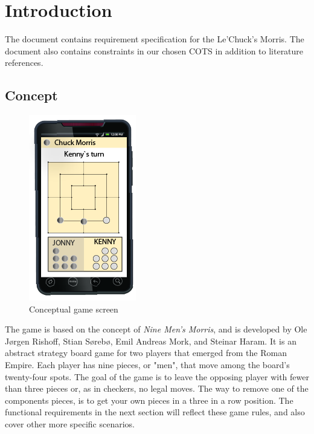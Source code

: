 \section{Introduction}

The document contains requirement specification for the Le'Chuck's Morris. The document also contains constraints in our chosen COTS in addition to literature references.

\subsection{Concept}

\begin{figure}
\vspace{-30pt}
\begin{center}
\includegraphics{concept.png}
\end{center}
\caption{Conceptual game screen}

\end{figure}


The game is based on the concept of \emph{Nine Men's Morris}, and is \newline developed by Ole Jørgen Rishoff, Stian Sørebø, Emil Andreas Mork, and Steinar Haram.
It is an abstract strategy board game for two players that emerged from the Roman Empire. Each player has nine pieces, or "men", that move among the board's twenty-four spots. The goal of the game is to leave the opposing player with fewer than three pieces or, as in checkers, no legal moves. The way to remove one of the components pieces, is to get your own pieces in a three in a row position. The functional requirements in the next section will reflect these game rules, and also cover other more specific scenarios. 



